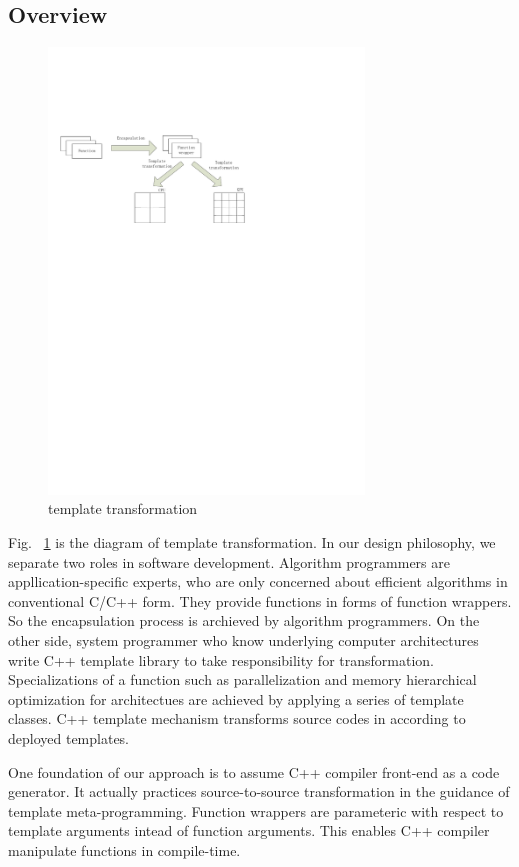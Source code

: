\documentclass[10pt, conference, compsocconf]{IEEEtran}
\begin{document}
\subsection{Overview}
\begin{figure}[htp]
\includegraphics[width=3.3in]{overview}
\caption{template transformation}\label{fig:overview}
\end{figure}
Fig. ~\ref{fig:overview} is the diagram of template transformation. In our design philosophy, we separate two roles in software
development. Algorithm programmers are appllication-specific experts,
who are only concerned about efficient algorithms in conventional
C/C++ form. They provide functions in forms of function wrappers. So
the encapsulation process is archieved by algorithm programmers. On the other side, system
programmer who know underlying computer architectures write C++
template library to take responsibility for transformation.
Specializations of a function such as parallelization and memory
hierarchical optimization for architectues are
achieved by applying a series of template classes. C++ template
mechanism transforms source codes in according to deployed templates.

One foundation of our approach is to assume C++
compiler front-end as a code generator. It actually practices
source-to-source transformation in the guidance of template
meta-programming. Function wrappers are parameteric with respect to
template arguments intead of function arguments. This enables
C++ compiler manipulate  functions in compile-time. 
\end{document}
